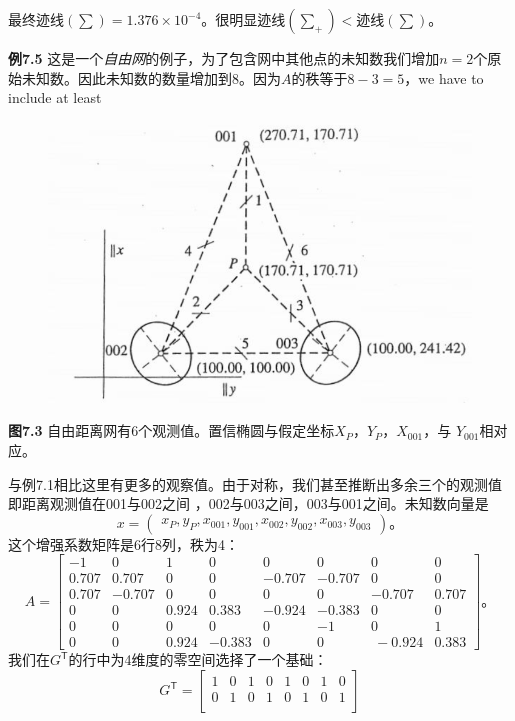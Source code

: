 最终迹线$(\sum) = 1.376 \times 10^{-4}$。很明显迹线$(\sum_+)$$ <$迹线$(\sum)$。
\par\noindent
\textbf{例7.5} 这是一个\emph{自由网}的例子，为了包含网中其他点的未知数我们增加$n = 2$个原始未知数。因此未知数的数量增加到8。因为$A$的秩等于$8 - 3 = 5$，we have to include at 
least
\begin{figure}
	\centering
	\includegraphics[width=0.4\linewidth]{TeX_files/Part02/chapter07/image/7-3}
	\caption{}
	\label{fig:7-3}
\end{figure}
\par\noindent
\textbf{图7.3} 自由距离网有6个观测值。置信椭圆与假定坐标$X_P$，$Y_P$，$X_{001}$，与 $Y_{001}$相对应。
\par\noindent
与例7.1相比这里有更多的观察值。由于对称，我们甚至推断出多余三个的观测值即距离观测值在001与002之间 ，002与003之间，003与001之间。未知数向量是
\begin{equation*}
	x =
	\begin{pmatrix}
		x_P,y_P,x_{001},y_{001},x_{002},
		y_{002},x_{003},y_{003}
	\end{pmatrix}\text{。}
\end{equation*}
这个增强系数矩阵是6行8列，秩为4：
\begin{equation*}
	A =
	\begin{bmatrix}
		-1 & 0 & 1 & 0 & 0 & 0 & 0 & 0\\
		0.707 & 0.707 & 0 & 0 & -0.707 & -0.707 & 0 & 0\\
		0.707 &-0.707& 0 &0 &0& 0& -0.707& 0.707\\
		0 & 0 &0.924& 0.383& -0.924 &-0.383& 0& 0\\
		0& 0 &0 &0 &0 &-1& 0& 1\\
		0& 0 &0.924 &-0.383& 0& 0&\ -0.924& 0.383
	\end{bmatrix}\text{。}
\end{equation*}
我们在$G^\mathsf{T}$的行中为4维度的零空间选择了一个基础：
\begin{equation*}
	G^\mathsf{T} =
	\begin{bmatrix}
		1 & 0 & 1 & 0 & 1 & 0 & 1 & 0\\
		0 & 1 & 0 & 1 & 0 & 1 & 0 & 1\\

\end{bmatrix}
\end{equation*}$$
